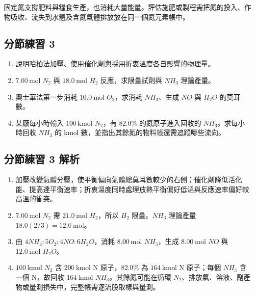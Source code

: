 \documentclass[11pt,a4paper]{article}
\providecommand{\tightlist}{%
  \setlength{\itemsep}{0pt}\setlength{\parskip}{0pt}}
\begin{document}
固定氮支撐肥料與糧食生產，也消耗大量能量。評估施肥或製程需把氮的投入、作物吸收、流失到水體及含氮氣體排放放在同一個氮元素帳中。

\subsection{分節練習 3}\label{ux5206ux7bc0ux7df4ux7fd2-3}

\begin{enumerate}
\def\labelenumi{\arabic{enumi}.}
\tightlist
\item
  說明哈柏法加壓、使用催化劑與採用折衷溫度各自影響的物理量。
\item
  \(7.00\ \mathrm{mol}\) \(N_2\) 與 \(18.0\ \mathrm{mol}\) \(H_2\) 反應，求限量試劑與 \(NH_3\) 理論產量。
\item
  奧士華法第一步消耗 \(10.0\ \mathrm{mol}\) \(O_2\)，求消耗 \(NH_3\)、生成 \(NO\) 與 \(H_2O\) 的莫耳數。
\item
  某廠每小時輸入 \(100\ \mathrm{kmol}\) \(N_2\)，有 \(82.0\%\) 的氮原子進入回收的 \(NH_3\)。求每小時回收 \(NH_3\) 的 kmol 數，並指出其餘氮的物料帳還需追蹤哪些流向。
\end{enumerate}

\subsection{分節練習 3 解析}\label{ux5206ux7bc0ux7df4ux7fd2-3-ux89e3ux6790}

\begin{enumerate}
\def\labelenumi{\arabic{enumi}.}
\tightlist
\item
  加壓改變氣體分壓，使平衡偏向氣體總莫耳數較少的右側；催化劑降低活化能、提高達平衡速率；折衷溫度同時處理放熱平衡偏好低溫與反應速率偏好較高溫的衝突。
\item
  \(7.00\ \mathrm{mol}\) \(N_2\) 需 \(21.0\ \mathrm{mol}\) \(H_2\)，所以 \(H_2\) 限量。\(NH_3\) 理論產量 \(18.0(2/3)=12.0\ \mathrm{mol}\)。
\item
  由 \(4NH_3:5O_2:4NO:6H_2O\)，消耗 \(8.00\ \mathrm{mol}\) \(NH_3\)，生成 \(8.00\ \mathrm{mol}\) \(NO\) 與 \(12.0\ \mathrm{mol}\) \(H_2O\)。
\item
  \(100\ \mathrm{kmol}\) \(N_2\) 含 \(200\ \mathrm{kmol}\) N 原子，\(82.0\%\) 為 \(164\ \mathrm{kmol}\) N 原子；每個 \(NH_3\) 含一個 N，故回收 \(164\ \mathrm{kmol}\) \(NH_3\)。其餘氮可能在循環 \(N_2\)、排放氣、溶液、副產物或量測損失中，完整帳需逐流股取樣與量測。
\end{enumerate}
\end{document}
